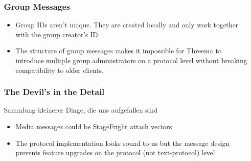 \documentclass[
	aspectratio=169,
	xetex,
]{beamer}
\begin{document}
\begin{frame}
	\frametitle{Group Messages}
	\begin{itemize}
		\item Group IDs aren't unique. They are created locally and only work together with the group creator's ID
		\item The structure of group messages makes it impossible for Threema to introduce multiple group administrators on a protocol level without breaking compatibility to older clients.
	\end{itemize}
\end{frame}

\begin{frame}
	\frametitle{The Devil's in the Detail}
	Sammlung kleinerer Dinge, die uns aufgefallen sind
	\begin{itemize}
		\item Media messages could be StageFright attach vectors
		\item The protocol implementation looks sound to us but the message design prevents feature upgrades on the protocol (not text-protocol) level

	\end{itemize}
\end{frame}
\end{document}
